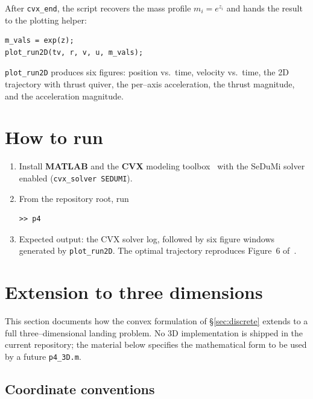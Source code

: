 \documentclass[11pt]{article}
\begin{document}
After \texttt{cvx\_end}, the script recovers the mass profile
$m_i = e^{z_i}$ and hands the result to the plotting helper:

\begin{lstlisting}
m_vals = exp(z);
plot_run2D(tv, r, v, u, m_vals);
\end{lstlisting}

\texttt{plot\_run2D} produces six figures: position vs.\ time,
velocity vs.\ time, the 2D trajectory with thrust quiver, the
per--axis acceleration, the thrust magnitude, and the acceleration
magnitude.

\section{How to run}

\begin{enumerate}
\item Install \textbf{MATLAB} and the \textbf{CVX}
      modeling toolbox~\cite{cvx} with the SeDuMi solver enabled
      (\texttt{cvx\_solver SEDUMI}).
\item From the repository root, run
\begin{lstlisting}[numbers=none]
>> p4
\end{lstlisting}
\item Expected output: the CVX solver log, followed by six figure
      windows generated by \texttt{plot\_run2D}.  The optimal
      trajectory reproduces Figure~6 of~\cite{Acikmese2007}.
\end{enumerate}

\section{Extension to three dimensions}
\label{sec:3d}

This section documents how the convex formulation of
\S\ref{sec:discrete} extends to a full three--dimensional landing
problem.  No 3D implementation is shipped in the current
repository; the material below specifies the mathematical form to
be used by a future \texttt{p4\_3D.m}.

\subsection{Coordinate conventions}
\end{document}
